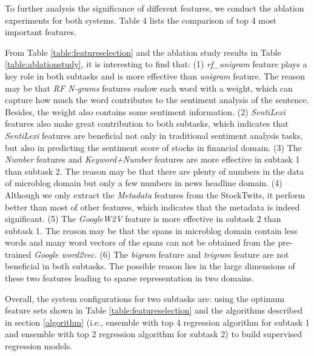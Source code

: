 \documentclass[11pt,a4paper]{article}
\begin{document}
To further analysis the significance of different features, we conduct the ablation experiments for both systems. Table 4 lists the comparison of top 4 most important features.

From Table \ref{table:featureselection} and the ablation study results in Table \ref{table:ablationstudy}, it is interesting to find that: (1) \emph{rf\_unigram} feature plays a key role in both subtasks and is more effective than \emph{unigram} feature. The reason may be that \emph{RF N-grams} features endow each word with a weight, which can capture how much the word contributes to the sentiment analysis of the sentence. Besides, the weight also contains some sentiment information. (2) \emph{SentiLexi} features also make great contribution to both subtasks, which indicates that \emph{SentiLexi} features are beneficial not only in traditional sentiment analysis tasks, but also in predicting the sentiment score of stocks in financial domain. (3) The \emph{Number} features and \emph{Keyword+Number} features are more effective in subtask 1 than subtask 2. The reason may be that there are plenty of numbers in the data of microblog domain but only a few numbers in news headline domain. (4) Although we only extract the \emph{Metadata} features from the StockTwits, it perform better than most of other features, which indicates that the metadata is indeed significant. (5) The \emph{GoogleW2V} feature is more effective in subtask 2 than subtask 1. The reason may be that the spans in microblog domain contain less words and many word vectors of the spans can not be obtained from the pre-trained \emph{Google word2vec}. (6) The \emph{bigram} feature and \emph{trigram} feature are not beneficial in both subtasks. The possible reason lies in the large dimensions of these two features leading to sparse representation in two domains.



Overall, the system configurations for two subtasks are: using the optimum feature sets shown in Table \ref{table:featureselection} and the algorithms described in section \ref{algorithm} (i.e., ensemble with top 4 regression algorithm for subtask 1 and ensemble with top 2 regression algorithm for subtask 2) to build supervised regression models.
\end{document}

